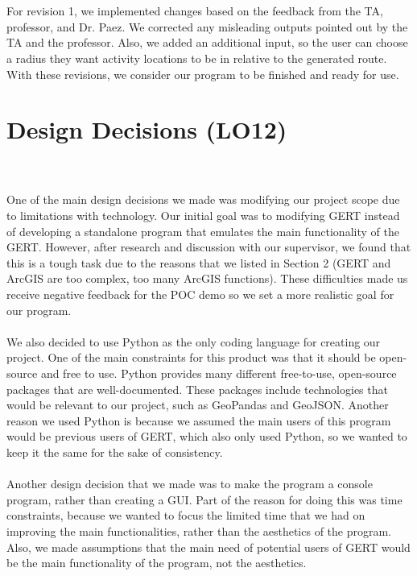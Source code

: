 \documentclass{article}
\begin{document}
\\ \\
For revision 1, we implemented changes based on the feedback from the TA, professor, and Dr. Paez. We corrected any misleading outputs pointed out by the TA and the professor. Also, we added an additional input, so the user can choose a radius they want activity locations to be in relative to the generated route. With these revisions, we consider our program to be finished and ready for use.

\section{Design Decisions (LO12)}

 \\ \\
One of the main design decisions we made was modifying our project scope due to limitations with technology. Our initial goal was to modifying GERT instead of developing a standalone program that emulates the main functionality of the GERT. However, after research and discussion with our supervisor, we found that this is a tough task due to the reasons that we listed in Section 2 (GERT and ArcGIS are too complex, too many ArcGIS functions). These difficulties made us receive negative feedback for the POC demo so we set a more realistic goal for our program.
\\ \\ 
We also decided to use Python as the only coding language for creating our project. One of the main constraints for this product was that it should be open-source and free to use. Python provides many different free-to-use, open-source packages that are well-documented. These packages include technologies that would be relevant to our project, such as GeoPandas and GeoJSON. Another reason we used Python is because we assumed the main users of this program would be previous users of GERT, which also only used Python, so we wanted to keep it the same for the sake of consistency.
\\ \\
Another design decision that we made was to make the program a console program, rather than creating a GUI. Part of the reason for doing this was time constraints, because we wanted to focus the limited time that we had on improving the main functionalities, rather than the aesthetics of the program. Also, we made assumptions that the main need of potential users of GERT would be the main functionality of the program, not the aesthetics.
\end{document}
